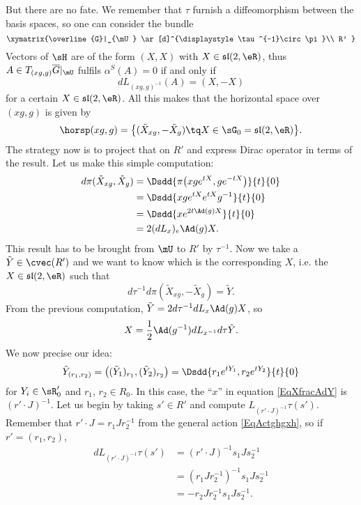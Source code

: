 But there are no fate. We remember that $\tau$ furnish a diffeomorphism between the basis spaces, so one can consider the bundle
\[
	\xymatrix{%
	\overline{G}|_{\mU} \ar[d]^{\displaystyle\tau^{-1}\circ\pi}\\
	R'
	}
\]
Vectors of $\sH$ are of the form $(X,X)$ with $X\in\mathfrak{sl}(2,\eR)$, thus $A\in T_{(xg,g)}\overline{G}|_{\mU}$ fulfils $\alpha^{S}(A)=0$ if and only if
\[
	dL_{(xg,g)^{-1}}(A)=(X,-X)
\]
for a certain $X\in \mathfrak{sl}(2,\eR)$. All this makes that the horizontal space over $(xg,g)$ is given by
\begin{equation}
	\horsp(xg,g)=\big\{ (\tilde X_{xg},-\tilde X_{g})\tq X\in \sG_0=\mathfrak{sl}(2,\eR) \big\}.
\end{equation}
The strategy now is to project that on $R'$ and express Dirac operator in terms of the result. Let us make this simple computation:
\begin{align*}
	d\pi(\tilde X_{xg},\tilde X_{g}) & =\Dsdd{ \pi\big( xg e^{tX},g e^{-tX} \big) }{t}{0} \\
	                                 & =\Dsdd{ xg e^{tX} e^{tX}g^{-1} }{t}{0}             \\
	                                 & =\Dsdd{ x e^{2t\Ad(g)X} }{t}{0}                    \\
	                                 & =2(dL_{x})_{e}\Ad(g)X.
\end{align*}
This result has to be brought from $\mU$ to $R'$ by $\tau^{-1}$. Now we take a $\tilde Y\in\cvec(R')$ and we want to know which is the corresponding $X$, i.e. the $X\in\mathfrak{sl}(2,\eR)$ such that
\[
	d\tau^{-1}d\pi(\tilde X_{xg},-\tilde X_{g})=\tilde Y.
\]
From the previous computation, $\tilde Y=2d\tau^{-1}dL_{x}\Ad(g)X$, so
\begin{equation}  \label{EqXfracAdY}
	X=\frac{ 1 }{2}\Ad(g^{-1})dL_{x^{-1}}d\tau\tilde Y.
\end{equation}
We now precise our idea:
\begin{equation}   \label{EqtildeYrunrdeux}
	\tilde Y_{(r_{1},r_2)}=\big(    (\tilde Y_{1})_{r_1},(\tilde Y_{2})_{r_2}   \big)=\Dsdd{ r_1 e^{tY_{1}},r_2 e^{tY_{2}} }{t}{0}
\end{equation}
for $Y_{i}\in\sR'_{0}$ and $r_1$, $r_2\in R_{0}$. In this case, the ``$x$'' in equation \eqref{EqXfracAdY} is $(r'\cdot J)^{-1}$. Let us begin by taking $s'\in R'$ and compute $L_{(r'\cdot J)^{-1}}\tau(s')$. Remember that $r'\cdot J=r_1Jr_2^{-1}$ from the general action \eqref{EqActghgxh}, so if $r'=(r_1,r_2)$,
\begin{align*}
	dL_{(r'\cdot J)^{-1}}\tau(s') & =(r'\cdot J)^{-1}s_1 Js_2^{-1}   \\
	                              & =(r_1Jr_2^{-1})^{-1}s_1Js_2^{-1} \\
	                              & =-r_2Jr_2^{-1}s_1Js_2^{-1}.
\end{align*}
